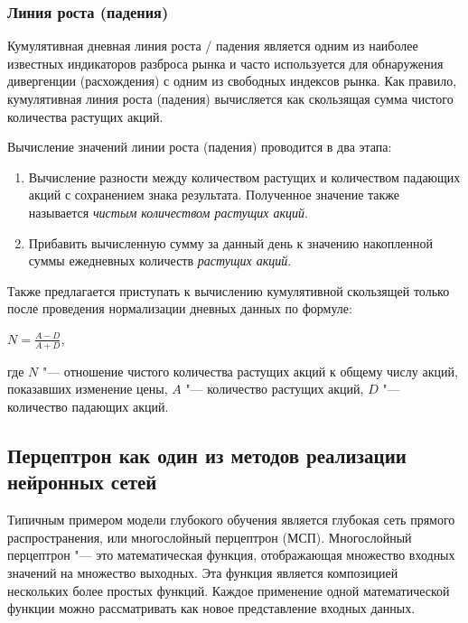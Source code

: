 \documentclass[bachelor, och, coursework]{SCWorks}
\begin{document}
            \subsubsection{Линия роста (падения)}
                Кумулятивная дневная линия роста / падения является одним из
                наиболее известных индикаторов разброса рынка и часто
                используется для обнаружения дивергенции (расхождения) с одним
                из свободных индексов рынка. Как правило, кумулятивная линия
                роста (падения) вычисляется как скользящая сумма чистого
                количества растущих акций.
                
                Вычисление значений линии роста (падения) проводится в два
                этапа:
                \begin{enumerate}
                    \item Вычисление разности между количеством растущих и
                    количеством падающих акций с сохранением знака результата.
                    Полученное значение также называется \textit{чистым
                    количеством растущих акций}.
                    \item Прибавить вычисленную сумму за данный день к значению
                    накопленной суммы ежедневных количеств \textit{растущих
                    акций}.
                \end{enumerate}

                Также предлагается приступать к вычислению кумулятивной
                скользящей только после проведения нормализации дневных данных
                по формуле:
                \begin{center}
                    $N = \frac{A - D}{A + D} $, 
                \end{center}
                где $N$ "--- отношение чистого количества растущих акций к
                общему числу акций, показавших изменение цены, $A$ "---
                количество растущих акций, $D$ "--- количество падающих акций.

        \subsection{Перцептрон как один из методов реализации нейронных сетей}
        
        Типичным примером модели глубокого обучения является глубокая сеть
        прямого распространения, или многослойный перцептрон (МСП). Многослойный
        перцептрон "--- это математическая функция, отображающая множество
        входных значений на множество выходных. Эта функция является композицией
        нескольких более простых функций. Каждое применение одной математической
        функции можно рассматривать как новое представление входных данных.
        
\end{document}

